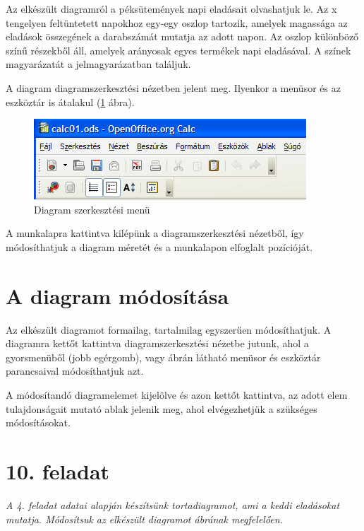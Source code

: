 Az elkészült diagramról a péksütemények napi eladásait
olvashatjuk le. Az x tengelyen feltüntetett  napokhoz egy-egy oszlop
tartozik, amelyek magassága az eladások összegének a
darabszámát mutatja az adott napon. Az oszlop különböző
színű részekből áll, amelyek arányosak egyes termékek
napi eladásával. A színek magyarázatát a jelmagyarázatban
találjuk.

A diagram diagramszerkesztési nézetben jelent meg. Ilyenkor a
menüsor és az eszköztár is átalakul (\ref{DiagramSzerkesztés} ábra).

\begin{figure}[!h]
\begin{center}
\includegraphics[width=10.211cm]{oocalcv2-img58.png}
\caption{Diagram szerkesztési menü}\label{DiagramSzerkesztés}
\end{center}
\end{figure}

A munkalapra kattintva kilépünk a diagramszerkesztési
nézetből, így módosíthatjuk a diagram  méretét és a
munkalapon elfoglalt pozícióját. 


\section{A diagram módosítása}

Az elkészült diagramot formailag, tartalmilag egyszerűen
módosíthatjuk. A diagramra kettőt kattintva
diagramszerkesztési nézetbe jutunk, ahol a gyorsmenüből (jobb
egérgomb), vagy  ábrán látható menüsor és
eszköztár parancsaival módosíthatjuk azt.

A módosítandó diagramelemet kijelölve és azon kettőt
kattintva, az adott elem tulajdonságait mutató ablak jelenik meg,
ahol elvégezhetjük a szükséges módosításokat.


\section{10. feladat}
{\itshape
A 4. feladat adatai alapján készítsünk tortadiagramot, ami a
keddi eladásokat mutatja. Módosítsuk az elkészült diagramot
 ábrának megfelelően.}

